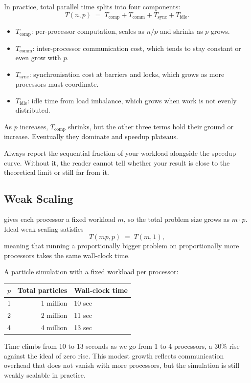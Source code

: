 In practice, total parallel time splits into four components:
\[
  T(n, p) \;=\; T_{\mathrm{comp}} + T_{\mathrm{comm}}
               + T_{\mathrm{sync}} + T_{\mathrm{idle}}.
\]
\begin{itemize}
  \item $T_{\mathrm{comp}}$: per-processor computation, scales as $n/p$
        and shrinks as $p$ grows.
  \item $T_{\mathrm{comm}}$: inter-processor communication cost, which
        tends to stay constant or even grow with $p$.
  \item $T_{\mathrm{sync}}$: synchronisation cost at barriers and locks,
        which grows as more processors must coordinate.
  \item $T_{\mathrm{idle}}$: idle time from load imbalance, which grows
        when work is not evenly distributed.
\end{itemize}
As $p$ increases, $T_{\mathrm{comp}}$ shrinks, but the other three terms
hold their ground or increase.
Eventually they dominate and speedup plateaus.

\begin{pppitfall}
Always report the sequential fraction of your workload alongside the
speedup curve.
Without it, the reader cannot tell whether your result is close to the
theoretical limit or still far from it.
\end{pppitfall}

\subsection{Weak Scaling}

\begin{ppdefn}
 gives each processor a fixed workload $m$, so the
total problem size grows as $m \cdot p$.
Ideal weak scaling satisfies
\[
  T(mp, p) \;=\; T(m, 1),
\]
meaning that running a proportionally bigger problem on proportionally
more processors takes the same wall-clock time.
\end{ppdefn}

\begin{ppexample}
A particle simulation with a fixed workload per processor:
\begin{center}
\begin{tabular}{@{}rrl@{}}
\toprule
$p$ & Total particles & Wall-clock time \\
\midrule
1   & 1 million  & 10 sec \\
2   & 2 million  & 11 sec \\
4   & 4 million  & 13 sec \\
\bottomrule
\end{tabular}
\end{center}
Time climbs from 10 to 13 seconds as we go from 1 to 4 processors, a
30\% rise against the ideal of zero rise.
This modest growth reflects communication overhead that does not vanish
with more processors, but the simulation is still weakly scalable in
practice.
\end{ppexample}

